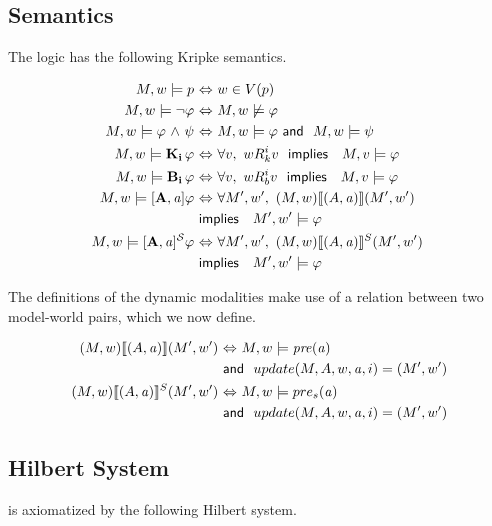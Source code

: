 \subsection{Semantics}
The logic \DASL has the following Kripke semantics.
\begin{tcolorbox}
	\begin{align*}
	M,w \models p  &\iiff w \in V(p) \\
	M,w \models \tlnot \varphi  &\iiff M,w \not\models \varphi \\ 
	M,w \models \varphi \tland \psi &\iiff M,w \models \varphi \aand M,w \models \psi \\
	M,w \models \Kns{i}\varphi &\iiff \forall v,\ w\Rel{k}^i v\ \timplies\ M,v \models \varphi \\
	M,w \models \Bels{i}\varphi &\iiff \forall v,\ w\Rel{b}^i v\ \timplies\ M,v \models \varphi \\
	M,w \models \Pal{A,\laa}\varphi &\iiff \forall M',w',\  (M,w) \llbracket (A,\laa) \rrbracket (M',w')\ \\&\timplies\ M',w' \models \varphi \\
	M,w \models \SPal{A,\laa}\varphi &\iiff \forall M',w',\  (M,w) \llbracket (A,\laa) \rrbracket^S (M',w')\ \\&\timplies\ M',w' \models \varphi 
	\end{align*}
\end{tcolorbox}
The definitions of the dynamic modalities make use of a relation between two model-world pairs, which we now define.
\begin{tcolorbox}
	\begin{align*}
	(M,w)\llbracket (A,\mathit{a})\rrbracket (M',w') &{\ \Leftrightarrow \ } M,w \models \mathit{pre}(\mathit{a}) \\&\textsf{\ and \ } update(M,A,w,\mathit{a},i) = (M',w') \\
	(M,w)\llbracket (A,\mathit{a}) \rrbracket^S (M',w') &{\ \Leftrightarrow \ } M,w \models pre_s(\mathit{a}) \\&\textsf{\ and \ } update(M,A,w,\mathit{a}, i) = (M',w') 
	\end{align*}
\end{tcolorbox}



\subsection{Hilbert System}
\DASL is axiomatized by the following Hilbert system.\\


